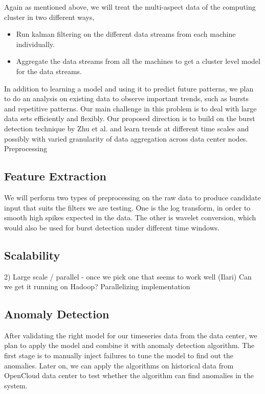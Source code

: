 Again as mentioned above, we will treat the multi-aspect data of the computing cluster in two different ways,

\begin{itemize}
\item Run kalman filtering on the different data streams from each machine individually.
\item Aggregate the data streams from all the machines to get a cluster level model for the data streams.
\end{itemize}

In addition to learning a model and using it to predict future patterns, we plan to do an analysis on existing data to observe important trends, such as bursts and repetitive patterns. Our main challenge in this problem is to deal with large data sets efficiently and flexibly. Our proposed direction is to build on the burst detection technique by Zhu et al. \cite{Zhu2003} and learn trends at different time scales and possibly with varied granularity of data aggregation across data center nodes.
Preprocessing

\subsection{Feature Extraction}
\label{sec:method:features}
We will perform two types of preprocessing on the raw data to produce candidate input that suits the filters we are testing. One is the log transform, in order to smooth high spikes expected in the data. The other is wavelet conversion, which would also be used for burst detection under different time windows.

\subsection{Scalability}
\label{sec:method:scale}
2) Large scale / parallel - once we pick one that seems to work well (Ilari)
   Can we get it running on Hadoop?
   Parallelizing implementation

\subsection{Anomaly Detection}
\label{sec:method:anomaly}
After validating the right model for our timeseries data from the data center, we plan to apply the model and combine it with anomaly detection algorithm. The first stage is to manually inject failures to tune the model to find out the anomalies. Later on, we can apply the algorithms on historical data from OpenCloud data center to test whether the algorithm can find anomalies in the system.



\newpage
{}


